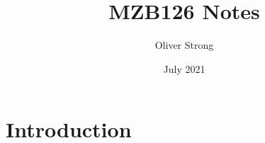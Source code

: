 \documentclass{article}
\title{MZB126 Notes}
\author{Oliver Strong}
\date{July 2021}
\begin{document}
\maketitle

\section{Introduction}
\end{document}
